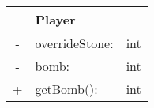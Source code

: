\vspace{1em}
\begin{table}[!h]
    \centering
    \begin{tabular}{|c l l|}
        \hline
        \textbf{} & {Player} & {} \\
        \hline
        - & overrideStone: & int \\
        - & bomb: & int \\
        \hline
        + & getBomb(): & int \\
        \hline
    \end{tabular}
    \label{tab:uml-player}
\end{table}


\bigskip
\newpage